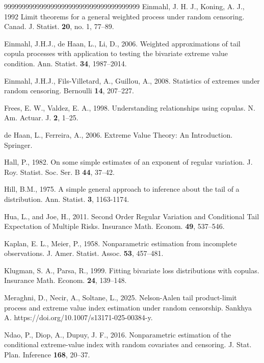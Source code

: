 \documentclass[reqno,openbib,runningheads,a4paper,12pt]{amsart}%
\begin{document}
\begin{thebibliography}{99999999999999999999999999999999999999}
Einmahl, J. H. J., Koning, A. J.,
1992 Limit theorems for a general weighted process under random censoring.
Canad. J. Statist. \textbf{20}, no. 1, 77--89.

Einmahl, J.H.J., de Haan, L.,
Li, D., 2006. Weighted approximations of tail copula processes with
application to testing the bivariate extreme value condition. Ann. Statist.
\textbf{34}, 1987--2014.

Einmahl, J.H.J.,
Fils-Villetard, A., Guillou, A., 2008. Statistics of extremes under random
censoring. Bernoulli \textbf{14}, 207--227.

Frees, E. W., Valdez, E. A., 1998.
Understanding relationships using copulas. N. Am. Actuar. J. \textbf{2}, 1--25.

de Haan, L., Ferreira, A., 2006.
Extreme Value Theory: An Introduction. Springer.

Hall, P., 1982. On some simple estimates of an
exponent of regular variation. J. Roy. Statist. Soc. Ser. B \textbf{44}, 37--42.

Hill, B.M., 1975. A simple general approach to
inference about the tail of a distribution. Ann. Statist. \textbf{3}, 1163-1174.

Hua, L., and Joe, H., 2011. Second Order
Regular Variation and Conditional Tail Expectation of Multiple Risks.
Insurance Math. Econom. \textbf{49}, 537--546.

Kaplan, E. L., Meier, P., 1958.
Nonparametric estimation from incomplete observations. J. Amer. Statist.
Assoc. \textbf{53}, 457--481.

Klugman, S. A., Parsa, R., 1999.
Fitting bivariate loss distributions with copulas. Insurance Math. Econom.
\textbf{24}, 139--148.

Meraghni, D., Necir, A.,
Soltane, L., 2025. Nelson-Aalen tail product-limit process and extreme value
index estimation under random censorship.\textit{ }Sankhya A\textit{. }https://doi.org/10.1007/s13171-025-00384-y.

Ndao, P., Diop, A., Dupuy, J. F., 2016.
Nonparametric estimation of the conditional extreme-value index with random
covariates and censoring. J. Stat. Plan. Inference \textbf{168}, 20--37.


\end{thebibliography}
\end{document}
